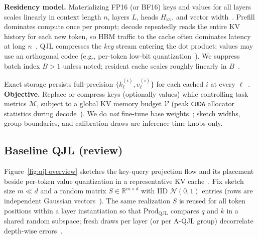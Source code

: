 \documentclass[conference]{IEEEtran}
\begin{document}
\textbf{Residency model.} Materializing FP16 (or BF16) keys and values for all layers scales linearly in context length \(n\), layers \(L\), heads \(H_{\mathrm{kv}}\), and vector width~\cite{touvron2023llama,zandieh2024qjl}. Prefill dominates compute once per prompt; decode repeatedly reads the entire KV history for each new token, so HBM traffic to the cache often dominates latency at long \(n\)~\cite{zandieh2024qjl,presentation_mqjl}. QJL compresses the \emph{key} stream entering the dot product; values may use an orthogonal codec (e.g., per-token low-bit quantization~\cite{kivi2024}). We suppress batch index \(B{>}1\) unless noted; resident cache scales roughly linearly in \(B\)~\cite{presentation_mqjl}.

Exact storage persists full-precision $\{k_\ell^{(i)}, v_\ell^{(i)}\}$ for each cached \(i\) at every \(\ell\)~\cite{zandieh2024qjl}. \textbf{Objective.} Replace or compress keys (optionally values) while controlling task metrics \(\mathcal{M}\), subject to a global KV memory budget \(\mathcal{V}\) (peak \texttt{CUDA} allocator statistics during decode~\cite{presentation_mqjl}). We do \emph{not} fine-tune base weights~\cite{touvron2023llama}; sketch widths, group boundaries, and calibration draws are inference-time knobs only.

\subsection{Baseline QJL (review)}
\label{sec:qjl}

Figure~\ref{fig:qjl-overview} sketches the key-query projection flow and its placement beside per-token value quantization in a representative KV cache~\cite{zandieh2024qjl,kivi2024}. Fix sketch size $m\ll d$ and a random matrix $S\in\mathbb{R}^{m\times d}$ with IID $\mathcal{N}(0,1)$ entries (rows are independent Gaussian vectors~\cite{zandieh2024qjl}). The same realization \(S\) is reused for all token positions within a layer instantiation so that \(\mathrm{Prod}_{\mathrm{QJL}}\) compares \(q\) and \(k\) in a shared random subspace; fresh draws per layer (or per A-QJL group) decorrelate depth-wise errors~\cite{zandieh2024qjl,zandieh2024aqjl-repo}.
\end{document}
